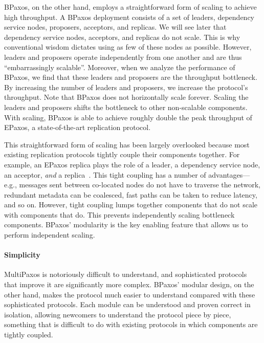 BPaxos, on the other hand, employs a straightforward form of scaling to achieve
high throughput. A BPaxos deployment consists of a set of leaders, dependency
service nodes, proposers, acceptors, and replicas. We will see later that
dependency service nodes, acceptors, and replicas do not scale. This is why
conventional wisdom dictates using as few of these nodes as possible. However,
leaders and proposers operate independently from one another and are thus
``embarrassingly scalable''. Moreover, when we analyze the performance of
BPaxos, we find that these leaders and proposers are the throughput bottleneck.
By increasing the number of leaders and proposers, we increase the protocol's
throughput. Note that BPaxos does not horizontally scale forever. Scaling the
leaders and proposers shifts the bottleneck to other non-scalable components.
With scaling, BPaxos is able to achieve roughly double the peak throughput of
EPaxos, a state-of-the-art replication protocol.

This straightforward form of scaling has been largely overlooked because most
existing replication protocols tightly couple their components together. For
example, an EPaxos replica plays the role of a leader, a dependency service
node, an acceptor, \emph{and} a replica~\cite{arun2017speeding}. This tight
coupling has a number of advantages---e.g., messages sent between co-located
nodes do not have to traverse the network, redundant metadata can be coalesced,
fast paths can be taken to reduce latency, and so on. However, tight coupling
lumps together components that do not scale with components that do. This
prevents independently scaling bottleneck components. BPaxos' modularity is the
key enabling feature that allows us to perform independent scaling.

\paragraph{Simplicity}
MultiPaxos is notoriously difficult to understand, and sophisticated protocols
that improve it are significantly more complex. BPaxos' modular design, on the
other hand, makes the protocol much easier to understand compared with these
sophisticated protocols. Each module can be understood and proven correct in
isolation, allowing newcomers to understand the protocol piece by piece,
something that is difficult to do with existing protocols in which components
are tightly coupled.

